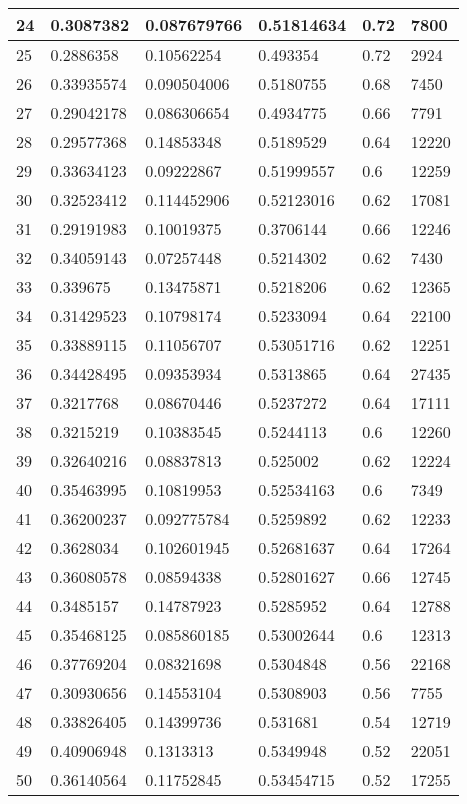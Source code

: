 \begin{longtable}{|l|l|l|l|l|l|}
24 & 0.3087382 & 0.087679766 & 0.51814634 & 0.72 & 7800 \\ \hline 
25 & 0.2886358 & 0.10562254 & 0.493354 & 0.72 & 2924 \\ \hline 
26 & 0.33935574 & 0.090504006 & 0.5180755 & 0.68 & 7450 \\ \hline 
27 & 0.29042178 & 0.086306654 & 0.4934775 & 0.66 & 7791 \\ \hline 
28 & 0.29577368 & 0.14853348 & 0.5189529 & 0.64 & 12220 \\ \hline 
29 & 0.33634123 & 0.09222867 & 0.51999557 & 0.6 & 12259 \\ \hline 
30 & 0.32523412 & 0.114452906 & 0.52123016 & 0.62 & 17081 \\ \hline 
31 & 0.29191983 & 0.10019375 & 0.3706144 & 0.66 & 12246 \\ \hline 
32 & 0.34059143 & 0.07257448 & 0.5214302 & 0.62 & 7430 \\ \hline 
33 & 0.339675 & 0.13475871 & 0.5218206 & 0.62 & 12365 \\ \hline 
34 & 0.31429523 & 0.10798174 & 0.5233094 & 0.64 & 22100 \\ \hline 
35 & 0.33889115 & 0.11056707 & 0.53051716 & 0.62 & 12251 \\ \hline 
36 & 0.34428495 & 0.09353934 & 0.5313865 & 0.64 & 27435 \\ \hline 
37 & 0.3217768 & 0.08670446 & 0.5237272 & 0.64 & 17111 \\ \hline 
38 & 0.3215219 & 0.10383545 & 0.5244113 & 0.6 & 12260 \\ \hline 
39 & 0.32640216 & 0.08837813 & 0.525002 & 0.62 & 12224 \\ \hline 
40 & 0.35463995 & 0.10819953 & 0.52534163 & 0.6 & 7349 \\ \hline 
41 & 0.36200237 & 0.092775784 & 0.5259892 & 0.62 & 12233 \\ \hline 
42 & 0.3628034 & 0.102601945 & 0.52681637 & 0.64 & 17264 \\ \hline 
43 & 0.36080578 & 0.08594338 & 0.52801627 & 0.66 & 12745 \\ \hline 
44 & 0.3485157 & 0.14787923 & 0.5285952 & 0.64 & 12788 \\ \hline 
45 & 0.35468125 & 0.085860185 & 0.53002644 & 0.6 & 12313 \\ \hline 
46 & 0.37769204 & 0.08321698 & 0.5304848 & 0.56 & 22168 \\ \hline 
47 & 0.30930656 & 0.14553104 & 0.5308903 & 0.56 & 7755 \\ \hline 
48 & 0.33826405 & 0.14399736 & 0.531681 & 0.54 & 12719 \\ \hline 
49 & 0.40906948 & 0.1313313 & 0.5349948 & 0.52 & 22051 \\ \hline 
50 & 0.36140564 & 0.11752845 & 0.53454715 & 0.52 & 17255 \\ \hline 
\end{longtable}
